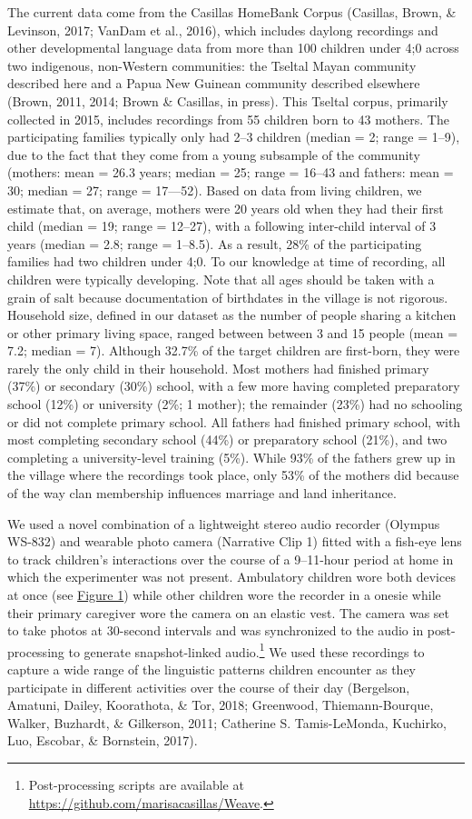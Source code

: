 \documentclass[floatsintext,man]{apa6}
\theoremstyle{definition}
\theoremstyle{definition}
\theoremstyle{definition}
\theoremstyle{remark}
\begin{document}
The current data come from the Casillas HomeBank Corpus (Casillas,
Brown, \& Levinson, 2017; VanDam et al., 2016), which includes daylong
recordings and other developmental language data from more than 100
children under 4;0 across two indigenous, non-Western communities: the
Tseltal Mayan community described here and a Papua New Guinean community
described elsewhere (Brown, 2011, 2014; Brown \& Casillas, in press).
This Tseltal corpus, primarily collected in 2015, includes recordings
from 55 children born to 43 mothers. The participating families
typically only had 2--3 children (median = 2; range = 1--9), due to the
fact that they come from a young subsample of the community (mothers:
mean = 26.3 years; median = 25; range = 16--43 and fathers: mean = 30;
median = 27; range = 17---52). Based on data from living children, we
estimate that, on average, mothers were 20 years old when they had their
first child (median = 19; range = 12--27), with a following inter-child
interval of 3 years (median = 2.8; range = 1--8.5). As a result, 28\% of
the participating families had two children under 4;0. To our knowledge
at time of recording, all children were typically developing. Note that
all ages should be taken with a grain of salt because documentation of
birthdates in the village is not rigorous. Household size, defined in
our dataset as the number of people sharing a kitchen or other primary
living space, ranged between between 3 and 15 people (mean = 7.2; median
= 7). Although 32.7\% of the target children are first-born, they were
rarely the only child in their household. Most mothers had finished
primary (37\%) or secondary (30\%) school, with a few more having
completed preparatory school (12\%) or university (2\%; 1 mother); the
remainder (23\%) had no schooling or did not complete primary school.
All fathers had finished primary school, with most completing secondary
school (44\%) or preparatory school (21\%), and two completing a
university-level training (5\%). While 93\% of the fathers grew up in
the village where the recordings took place, only 53\% of the mothers
did because of the way clan membership influences marriage and land
inheritance.

We used a novel combination of a lightweight stereo audio recorder
(Olympus WS-832) and wearable photo camera (Narrative Clip 1) fitted
with a fish-eye lens to track children's interactions over the course of
a 9--11-hour period at home in which the experimenter was not present.
Ambulatory children wore both devices at once (see
\protect\hyperlink{fig1}{Figure 1}) while other children wore the
recorder in a onesie while their primary caregiver wore the camera on an
elastic vest. The camera was set to take photos at 30-second intervals
and was synchronized to the audio in post-processing to generate
snapshot-linked audio.\footnote{Post-processing scripts are available at
  \url{https://github.com/marisacasillas/Weave}.} We used these
recordings to capture a wide range of the linguistic patterns children
encounter as they participate in different activities over the course of
their day (Bergelson, Amatuni, Dailey, Koorathota, \& Tor, 2018;
Greenwood, Thiemann-Bourque, Walker, Buzhardt, \& Gilkerson, 2011;
Catherine S. Tamis-LeMonda, Kuchirko, Luo, Escobar, \& Bornstein, 2017).
\end{document}

